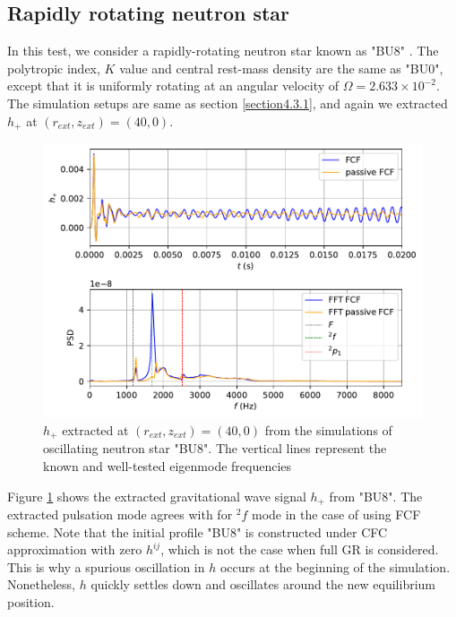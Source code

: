 \subsection{Rapidly rotating neutron star}
\label{section4.3.2}
In this test, we consider a rapidly-rotating neutron star known as "BU8" \cite{dimmelmeier2006non}.
The polytropic index, $K$ value and central rest-mass density are the same as "BU0",
except that it is uniformly rotating at an angular velocity of $\Omega = 2.633 \times 10^{-2}$.
The simulation setups are same as section \ref{section4.3.1},
and again we extracted $h_{+}$ at $(r_{ext}, z_{ext}) = (40, 0)$.
\begin{figure}[h!]
\centering
  \includegraphics[width=\linewidth]{GW_combine_h_BU8.pdf}
\caption{$h_{+}$ extracted at $(r_{ext}, z_{ext}) = (40, 0)$ from the simulations of oscillating neutron star "BU8".
The vertical lines represent the known and well-tested eigenmode frequencies \cite{dimmelmeier2006non}}
\label{fig:GW_h_BU8}
\end{figure}
Figure \ref{fig:GW_h_BU8} shows the extracted gravitational wave signal $h_{+}$ from "BU8".
The extracted pulsation mode agrees with \cite{dimmelmeier2006non} for ${}^2f$ mode in the case of using FCF scheme.
Note that the initial profile "BU8" is constructed under CFC approximation with zero $h^{ij}$,
which is not the case when full GR is considered.
This is why a spurious oscillation in $h$ occurs at the beginning of the simulation.
Nonetheless, $h$ quickly settles down and oscillates around the new equilibrium position.

